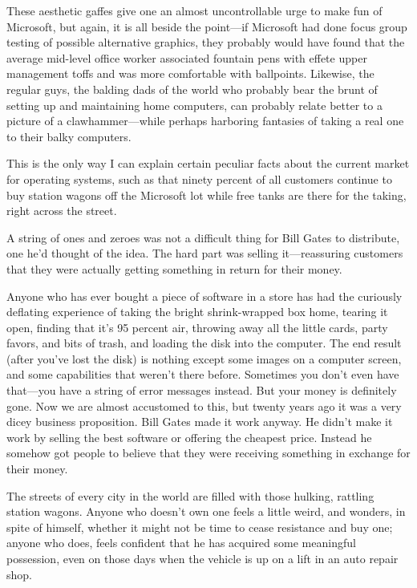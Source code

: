 \documentclass[
  fontsize=11pt,
  paper=landscape,
  twocolumn=true,
  pagesize=pdftex,
  headings=small,
  DIV=15,
  ]{scrartcl}
\begin{document}
These aesthetic gaffes give one an almost uncontrollable urge to make
fun of Microsoft, but again, it is all beside the point---if Microsoft
had done focus group testing of possible alternative graphics, they
probably would have found that the average mid-level office worker
associated fountain pens with effete upper management toffs and was more
comfortable with ballpoints. Likewise, the regular guys, the balding
dads of the world who probably bear the brunt of setting up and
maintaining home computers, can probably relate better to a picture of a
clawhammer---while perhaps harboring fantasies of taking a real one to
their balky computers.

This is the only way I can explain certain peculiar facts about the
current market for operating systems, such as that ninety percent of all
customers continue to buy station wagons off the Microsoft lot while
free tanks are there for the taking, right across the street.

A string of ones and zeroes was not a difficult thing for Bill Gates to
distribute, one he'd thought of the idea. The hard part was selling
it---reassuring customers that they were actually getting something in
return for their money.

Anyone who has ever bought a piece of software in a store has had the
curiously deflating experience of taking the bright shrink-wrapped box
home, tearing it open, finding that it's 95 percent air, throwing away
all the little cards, party favors, and bits of trash, and loading the
disk into the computer. The end result (after you've lost the disk) is
nothing except some images on a computer screen, and some capabilities
that weren't there before. Sometimes you don't even have that---you have
a string of error messages instead. But your money is definitely gone.
Now we are almost accustomed to this, but twenty years ago it was a very
dicey business proposition. Bill Gates made it work anyway. He didn't
make it work by selling the best software or offering the cheapest
price. Instead he somehow got people to believe that they were receiving
something in exchange for their money.

The streets of every city in the world are filled with those hulking,
rattling station wagons. Anyone who doesn't own one feels a little
weird, and wonders, in spite of himself, whether it might not be time to
cease resistance and buy one; anyone who does, feels confident that he
has acquired some meaningful possession, even on those days when the
vehicle is up on a lift in an auto repair shop.
\end{document}
